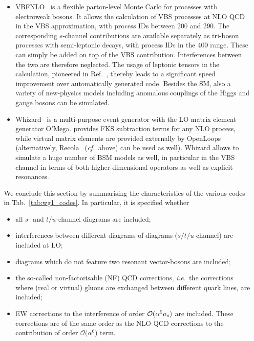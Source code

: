 \begin{itemize}
  \item {\sc VBFNLO}~\cite{Arnold:2008rz, Arnold:2011wj, Baglio:2014uba} is a flexible
    parton-level Monte Carlo for processes with electroweak bosons. It
    allows the calculation of VBS processes at NLO QCD in the VBS
    approximation, with process IDs between 200 and 290. The corresponding
    $s$-channel contributions are available separately as tri-boson processes with
    semi-leptonic decays, with process IDs in the 400 range. These can simply
    be added on top of the VBS contribution. Interferences between the two are therefore neglected.
    The usage of leptonic tensors in the calculation, pioneered in
    Ref.~\cite{Jager:2006zc}, thereby leads to a significant speed improvement over
    automatically generated code.  Besides the SM, also a variety of
    new-physics models including anomalous couplings of the Higgs and gauge
    bosons can be simulated.

  \item {\sc Whizard}~\cite{Moretti:2001zz,Kilian:2007gr} is a multi-purpose
      event generator with the LO matrix element generator {\sc O'Mega}. 
provides FKS subtraction terms for any NLO process, while virtual matrix
elements are provided externally by {\sc
OpenLoops}~\cite{Cascioli:2011va} (alternatively, {\sc Recola}~\cite{Actis:2012qn,Actis:2016mpe}
(\emph{cf.}\ above) can be used as well). {\sc Whizard} allows to simulate a
huge number of BSM models as well, in particular in
the VBS channel in terms of both higher-dimensional operators as well as explicit
resonances.

\end{itemize}

We conclude this section by summarising the characteristics of the various codes in Tab.~\ref{tab:wg1_codes}.
In particular, it is specified whether
\begin{itemize}
    \item all $s$- and $t/u$-channel diagrams are included;
    \item interferences between different diagrams of diagrams ($s/t/u$-channel) are included at LO;
    \item diagrams which do not feature two resonant vector-bosons are included;
    \item the so-called non-factorisable (NF) QCD corrections, \emph{i.e.}\ the corrections where (real or virtual) gluons are exchanged between different quark lines,
        are included;
    \item EW corrections to the interference of order $\mathcal O (\alpha^5\alpha_\text{s})$ are included.
    These corrections are of the same order as the NLO QCD corrections to the contribution of order $\mathcal O (\alpha^6$) term.
\end{itemize}

